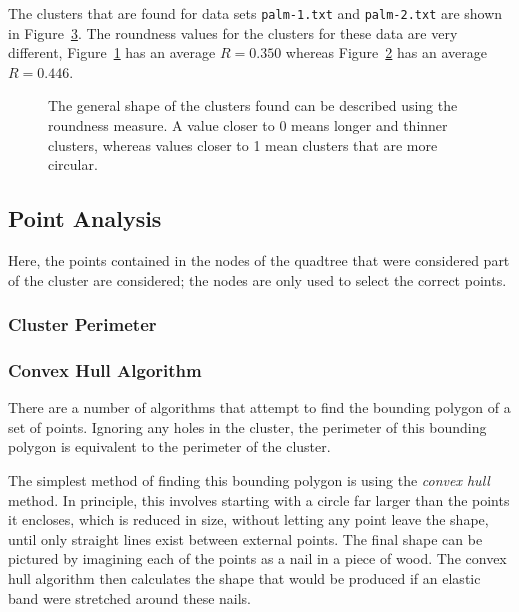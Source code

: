 The clusters that are found for data sets \texttt{palm-1.txt} and
\texttt{palm-2.txt} are shown in Figure~\ref{fig:roundness}. The roundness
values for the clusters for these data are very different,
Figure~\ref{fig:roundness-long.png} has an average $R=0.350$ whereas
Figure~\ref{fig:roundness-round.png} has an average $R=0.446$.

\begin{figure}[tbh]
	\centering
	\begin{subfigure}[b]{4.2cm}
		\caption{}\label{fig:roundness-long.png}
	\end{subfigure}%
	\quad
	\begin{subfigure}[b]{4.2cm}
		\caption{}\label{fig:roundness-round.png}
	\end{subfigure}

	\caption[A comparison of roundness values.]{The general shape of the
		clusters found can be described using the roundness measure. A value
		closer to 0 means longer and thinner clusters, whereas values closer to
		1 mean clusters that are more circular.}\label{fig:roundness}
\end{figure}

\subsection{Point Analysis}
\label{sub:point_analysis}

Here, the points contained in the nodes of the quadtree that were considered
part of the cluster are considered; the nodes are only used to select the
correct points.

\subsubsection{Cluster Perimeter}
\label{ssub:cluster_perimeter_point}

\subsubsection*{Convex Hull Algorithm}
\label{ssub:Convex Hull Algorithm}

There are a number of algorithms that attempt to find the bounding polygon of a
set of points. Ignoring any holes in the cluster, the perimeter of this
bounding polygon is equivalent to the perimeter of the cluster.

The simplest method of finding this bounding polygon is using the \emph{convex
hull} method\cite{barber1996quickhull}. In principle, this involves starting
with a circle far larger than the points it encloses, which is reduced in size,
without letting any point leave the shape, until only straight lines exist
between external points. The final shape can be pictured by imagining each of
the points as a nail in a piece of wood. The convex hull algorithm then
calculates the shape that would be produced if an elastic band were stretched
around these nails.

